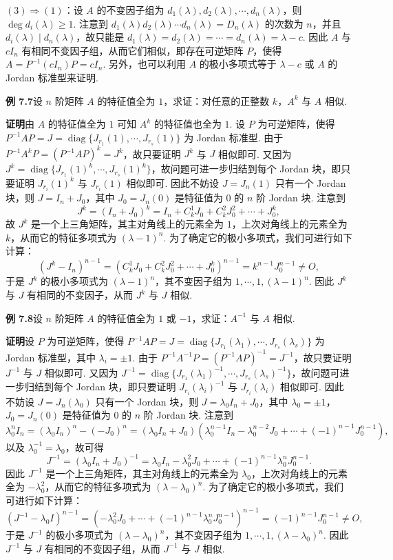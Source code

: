 \documentclass[UTF8, 12pt, fontset=fandol, oneside]{ctexart}
\begin{document}
$(3)\Rightarrow(1)$：设 $A$ 的不变因子组为 $d_1(\lambda),d_2(\lambda),\cdots,d_n(\lambda)$，则 $\deg d_i(\lambda)\ge 1$. 注意到 $d_1(\lambda)d_2(\lambda)\cdots d_n(\lambda)=D_n(\lambda)$ 的次数为 $n$，并且 $d_i(\lambda)\mid d_n(\lambda)$，故只能是 $d_1(\lambda)=d_2(\lambda)=\cdots=d_n(\lambda)=\lambda-c$. 因此 $A$ 与 $cI_n$ 有相同不变因子组，从而它们相似，即存在可逆矩阵 $P$，使得 $A=P^{-1}(cI_n)P=cI_n$. 另外，也可以利用 $A$ 的极小多项式等于 $\lambda-c$ 或 $A$ 的 Jordan 标准型来证明.

\noindent\textbf{例 7.7}\quad 设 $n$ 阶矩阵 $A$ 的特征值全为 $1$，求证：对任意的正整数 $k$，$A^k$ 与 $A$ 相似.

\noindent\textbf{证明}\quad 由 $A$ 的特征值全为 $1$ 可知 $A^k$ 的特征值也全为 $1$. 设 $P$ 为可逆矩阵，使得 $P^{-1}AP=J=\operatorname{diag}\{J_{r_1}(1),\cdots,J_{r_s}(1)\}$ 为 Jordan 标准型. 由于 $P^{-1}A^kP=(P^{-1}AP)^k=J^k$，故只要证明 $J^k$ 与 $J$ 相似即可. 又因为 $J^k=\operatorname{diag}\{J_{r_1}(1)^k,\cdots,J_{r_s}(1)^k\}$，故问题可进一步归结到每个 Jordan 块，即只要证明 $J_{r_i}(1)^k$ 与 $J_{r_i}(1)$ 相似即可. 因此不妨设 $J=J_n(1)$ 只有一个 Jordan 块，则 $J=I_n+J_0$，其中 $J_0=J_n(0)$ 是特征值为 $0$ 的 $n$ 阶 Jordan 块. 注意到
\[
J^k=(I_n+J_0)^k=I_n+C_k^1J_0+C_k^2J_0^2+\cdots+J_0^k,
\]
故 $J^k$ 是一个上三角矩阵，其主对角线上的元素全为 $1$，上次对角线上的元素全为 $k$，从而它的特征多项式为 $(\lambda-1)^n$. 为了确定它的极小多项式，我们可进行如下计算：
\[
(J^k-I_n)^{n-1}=(C_k^1J_0+C_k^2J_0^2+\cdots+J_0^k)^{n-1}=k^{n-1}J_0^{n-1}\ne O,
\]
于是 $J^k$ 的极小多项式为 $(\lambda-1)^n$，其不变因子组为 $1,\cdots,1,(\lambda-1)^n$. 因此 $J^k$ 与 $J$ 有相同的不变因子，从而 $J^k$ 与 $J$ 相似.

\noindent\textbf{例 7.8}\quad 设 $n$ 阶矩阵 $A$ 的特征值全为 $1$ 或 $-1$，求证：$A^{-1}$ 与 $A$ 相似.

\noindent\textbf{证明}\quad 设 $P$ 为可逆矩阵，使得 $P^{-1}AP=J=\operatorname{diag}\{J_{r_1}(\lambda_1),\cdots,J_{r_s}(\lambda_s)\}$ 为 Jordan 标准型，其中 $\lambda_i=\pm 1$. 由于 $P^{-1}A^{-1}P=(P^{-1}AP)^{-1}=J^{-1}$，故只要证明 $J^{-1}$ 与 $J$ 相似即可. 又因为 $J^{-1}=\operatorname{diag}\{J_{r_1}(\lambda_1)^{-1},\cdots,J_{r_s}(\lambda_s)^{-1}\}$，故问题可进一步归结到每个 Jordan 块，即只要证明 $J_{r_i}(\lambda_i)^{-1}$ 与 $J_{r_i}(\lambda_i)$ 相似即可. 因此不妨设 $J=J_n(\lambda_0)$ 只有一个 Jordan 块，则 $J=\lambda_0I_n+J_0$，其中 $\lambda_0=\pm 1$，$J_0=J_n(0)$ 是特征值为 $0$ 的 $n$ 阶 Jordan 块. 注意到
\[
\lambda_0^nI_n=(\lambda_0I_n)^n-(-J_0)^n=(\lambda_0I_n+J_0)(\lambda_0^{n-1}I_n-\lambda_0^{n-2}J_0+\cdots+(-1)^{n-1}J_0^{n-1}),
\]
以及 $\lambda_0^{-1}=\lambda_0$，故可得
\[
J^{-1}=(\lambda_0I_n+J_0)^{-1}=\lambda_0I_n-\lambda_0^2J_0+\cdots+(-1)^{n-1}\lambda_0^nJ_0^{n-1}.
\]
因此 $J^{-1}$ 是一个上三角矩阵，其主对角线上的元素全为 $\lambda_0$，上次对角线上的元素全为 $-\lambda_0^2$，从而它的特征多项式为 $(\lambda-\lambda_0)^n$. 为了确定它的极小多项式，我们可进行如下计算：
\[
(J^{-1}-\lambda_0I)^{n-1}=(-\lambda_0^2J_0+\cdots+(-1)^{n-1}\lambda_0^nJ_0^{n-1})^{n-1}=(-1)^{n-1}J_0^{n-1}\ne O,
\]
于是 $J^{-1}$ 的极小多项式为 $(\lambda-\lambda_0)^n$，其不变因子组为 $1,\cdots,1,(\lambda-\lambda_0)^n$. 因此 $J^{-1}$ 与 $J$ 有相同的不变因子组，从而 $J^{-1}$ 与 $J$ 相似.
\end{document}
